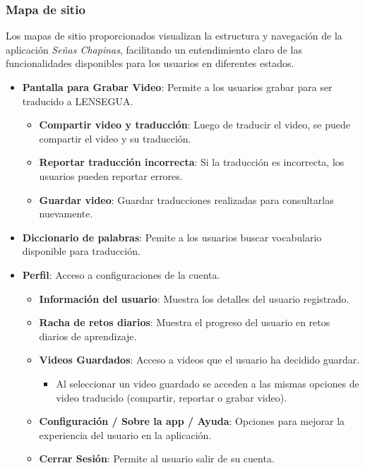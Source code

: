 
\subsubsection{Mapa de sitio}

Los mapas de sitio proporcionados visualizan la estructura y navegación de la aplicación \textit{Señas Chapinas}, facilitando un entendimiento claro de las funcionalidades disponibles para los usuarios en diferentes estados.

\begin{itemize}
    \item \textbf{Pantalla para Grabar Video}: Permite a los usuarios grabar para ser traducido a LENSEGUA. 
    \begin{itemize}
        \item \textbf{Compartir video y traducción}: Luego de traducir el video, se puede compartir el video y su traducción.
        \item \textbf{Reportar traducción incorrecta}: Si la traducción es incorrecta, los usuarios pueden reportar errores.
        \item \textbf{Guardar video}: Guardar traducciones realizadas para consultarlas nuevamente.
    \end{itemize}
    \item \textbf{Diccionario de palabras}: Pemite a los usuarios buscar vocabulario disponible para traducción. 
    
    \item \textbf{Perfil}: Acceso a configuraciones de la cuenta.
    \begin{itemize}
        \item \textbf{Información del usuario}: Muestra los detalles del usuario registrado.
        \item \textbf{Racha de retos diarios}: Muestra el progreso del usuario en retos diarios de aprendizaje.
        \item \textbf{Videos Guardados}: Acceso a videos que el usuario ha decidido guardar.
        \begin{itemize}
            \item Al seleccionar un video guardado se acceden a las mismas opciones de video traducido (compartir, reportar o grabar video).
        \end{itemize}
        \item \textbf{Configuración / Sobre la app / Ayuda}: Opciones para mejorar la experiencia del usuario en la aplicación.
        \item \textbf{Cerrar Sesión}: Permite al usuario salir de su cuenta.
    \end{itemize}
\end{itemize}

